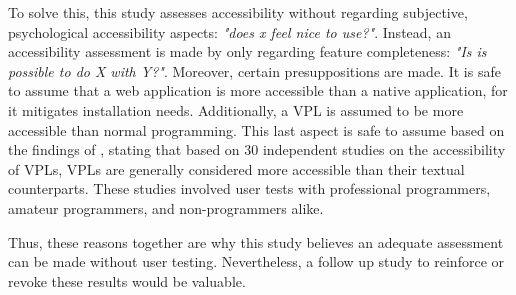 To solve this, this study assesses accessibility without regarding subjective, psychological accessibility aspects: \emph{"does x feel nice to use?"}.
Instead, an accessibility assessment is made by only regarding feature completeness: \emph{"Is is possible to do X with Y?"}.
Moreover, certain presuppositions are made.
It is safe to assume that a web application is more accessible than a native application, for it mitigates installation needs. 
Additionally, a VPL is assumed to be more accessible than normal programming.
This last aspect is safe to assume based on the findings of \citet{kuhail_characterizing_2021}, stating that based on 30 independent studies on the accessibility of VPLs, VPLs are generally considered more accessible than their textual counterparts.
These studies involved user tests with professional programmers, amateur programmers, and non-programmers alike. 

Thus, these reasons together are why this study believes an adequate assessment can be made without user testing. 
Nevertheless, a follow up study to reinforce or revoke these results would be valuable.









